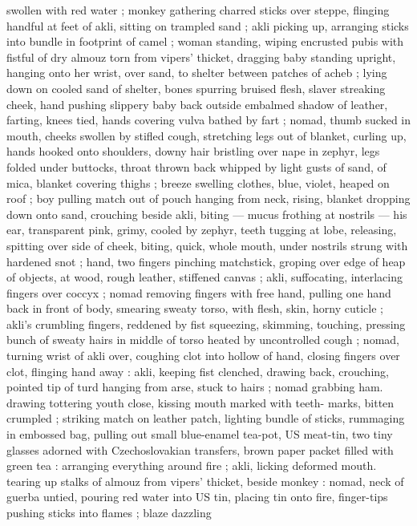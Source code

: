 swollen with red water ; monkey gathering charred sticks over
steppe, flinging handful at feet of akli, sitting on trampled sand ; akli
picking up, arranging sticks into bundle in footprint of camel ; woman
standing, wiping encrusted pubis with fistful of dry almouz torn from
vipers’ thicket, dragging baby standing upright, hanging onto her
wrist, over sand, to shelter between patches of acheb ; lying down on
cooled sand of shelter, bones spurring bruised flesh, slaver
streaking cheek, hand pushing slippery baby back outside embalmed
shadow of leather, farting, knees tied, hands covering vulva bathed
by fart ; nomad, thumb sucked in mouth, cheeks swollen by stifled
cough, stretching legs out of blanket, curling up, hands hooked onto
shoulders, downy hair bristling over nape in zephyr, legs folded
under buttocks, throat thrown back whipped by light gusts of sand,
of mica, blanket covering thighs ; breeze swelling clothes, blue,
violet, heaped on roof ; boy pulling match out of pouch hanging from
neck, rising, blanket dropping down onto sand, crouching beside akli,
biting --- mucus frothing at nostrils --- his ear, transparent pink,
grimy, cooled by zephyr, teeth tugging at lobe, releasing, spitting
over side of cheek, biting, quick, whole mouth, under nostrils strung
with hardened snot ; hand, two fingers pinching matchstick, groping
over edge of heap of objects, at wood, rough leather, stiffened
canvas ; akli, suffocating, interlacing fingers over coccyx ; nomad
removing fingers with free hand, pulling one hand back in front of
body, smearing sweaty torso, with flesh, skin, horny cuticle ; akli's
crumbling fingers, reddened by fist squeezing, skimming, touching,
pressing bunch of sweaty hairs in middle of torso heated by
uncontrolled cough ; nomad, turning wrist of akli over, coughing clot
into hollow of hand, closing fingers over clot, flinging hand away :
akli, keeping fist clenched, drawing back, crouching, pointed tip of
turd hanging from arse, stuck to hairs ; nomad grabbing ham.
drawing tottering youth close, kissing mouth marked with teeth-
marks, bitten crumpled ; striking match on leather patch, lighting
bundle of sticks, rummaging in embossed bag, pulling out small
blue-enamel tea-pot, US meat-tin, two tiny glasses adorned with
Czechoslovakian transfers, brown paper packet filled with green tea
: arranging everything around fire ; akli, licking deformed mouth.
tearing up stalks of almouz from vipers’ thicket, beside monkey :
nomad, neck of guerba untied, pouring red water into US tin, placing
tin onto fire, finger-tips pushing sticks into flames ; blaze dazzling
